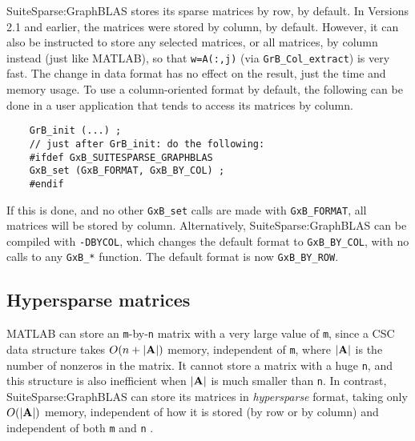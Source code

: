 \documentclass[12pt]{article}
\begin{document}
SuiteSparse:GraphBLAS stores its sparse matrices by row, by default.  In
Versions 2.1 and earlier, the matrices were stored by column, by default.
However, it can also be instructed to store any selected matrices, or all
matrices, by column instead (just like MATLAB), so that \verb'w=A(:,j)' (via
\verb'GrB_Col_extract') is very fast.  The change in data format has no effect
on the result, just the time and memory usage.  To use a column-oriented format
by default, the following can be done in a user application that tends to
access its matrices by column.

    {\footnotesize
    \begin{verbatim}
    GrB_init (...) ;
    // just after GrB_init: do the following:
    #ifdef GxB_SUITESPARSE_GRAPHBLAS
    GxB_set (GxB_FORMAT, GxB_BY_COL) ;
    #endif \end{verbatim} }

If this is done, and no other \verb'GxB_set' calls are made with
\verb'GxB_FORMAT', all matrices will be stored by column.  Alternatively,
SuiteSparse:GraphBLAS can be compiled with \verb'-DBYCOL', which changes the
default format to \verb'GxB_BY_COL', with no calls to any \verb'GxB_*'
function.  The default format is now \verb'GxB_BY_ROW'.

\subsection{Hypersparse matrices}
\label{hypersparse}

MATLAB can store an \verb'm'-by-\verb'n' matrix with a very large value of
\verb'm', since a CSC data structure takes $O(n+|{\bf A}|)$ memory, independent
of \verb'm', where $|{\bf A}|$ is the number of nonzeros in the matrix.  It
cannot store a matrix with a huge \verb'n', and this structure is also
inefficient when $|{\bf A}|$ is much smaller than \verb'n'.  In contrast,
SuiteSparse:GraphBLAS can store its matrices in {\em hypersparse} format,
taking only $O(|{\bf A}|)$ memory, independent of how it is stored (by row or
by column) and independent of both \verb'm' and \verb'n'
\cite{BulucGilbert08,BulucGilbert12}.
\end{document}
